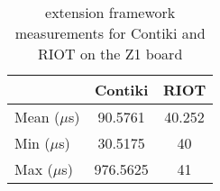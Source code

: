 \begin{table}[!ht]
  \centering
  \begin{tabular}{l|c|c}
                & Contiki  & RIOT \\ \hline
  Mean ($\mu$s) & 90.5761  & 40.252      \\
  Min  ($\mu$s) & 30.5175  & 40      \\
  Max  ($\mu$s) & 976.5625 & 41     
  \end{tabular}
  \caption{extension framework measurements for Contiki and RIOT on the Z1 board}
  \label{tab:extension-framework-z1}
  \end{table}